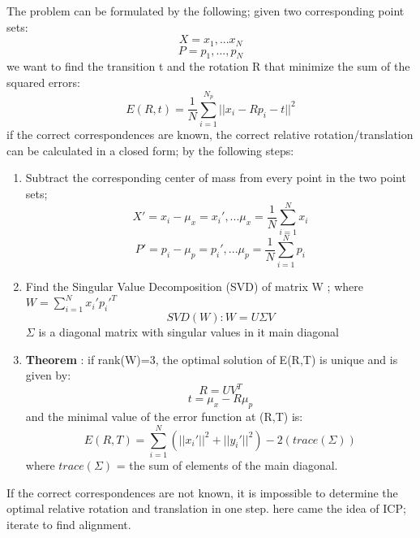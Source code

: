 \documentclass[a4paper,12pt]{article}
\begin{document}
The problem can be formulated by the following; given two corresponding point sets:
$$X = {x_1,...x_N}$$
$$P={p_1,...,p_N}$$
we want to find the transition t and the rotation R that minimize the sum of the squared errors:
$$E(R,t)=\frac{1}{N}\sum^{N_p}_{i=1}||x_i-Rp_i-t||^2$$
if the correct correspondences are known, the correct relative rotation/translation can be calculated in a closed form; by the following steps:
\begin{enumerate}
    \item Subtract the corresponding center of mass from every point in the two point sets; 
    $$X'={x_i-\mu_x}={x_i'},... \mu_x=\frac{1}{N}\sum^N_{i=1}x_i$$
    $$P'={p_i-\mu_p}={p_i'},... \mu_p=\frac{1}{N}\sum^N_{i=1}p_i$$
    \item Find the Singular Value Decomposition (SVD) of matrix W ; where $W=\sum^N_{i=1} x_i' p_i'^T$
    $$SVD(W): W=U\Sigma V$$
    $\Sigma$ is a diagonal matrix with singular values in it main diagonal
    \item \textbf{Theorem} : if rank(W)=3, the optimal solution of E(R,T) is unique and is given by:
    $$R=UV^T$$
    $$t=\mu_x-R\mu_p$$
    and the minimal value of the error function at (R,T) is:
    $$E(R,T)=\sum^N_{i=1}(||x_i'||^2+||y_i'||^2)-2(trace(\Sigma))$$
    where $trace(\Sigma)$ = the sum of elements of the main diagonal.
\end{enumerate}

If the correct correspondences are not known, it is impossible to determine the optimal relative rotation and translation in one step. here came the idea of ICP; iterate to find alignment.\\
\end{document}
